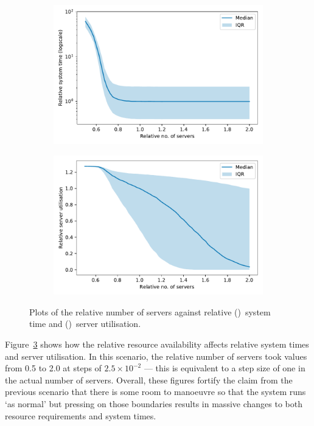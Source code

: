 \documentclass[11pt]{article}
\newlength{\imgwidth}
\begin{document}
\begin{figure}
    \centering
    \begin{subfigure}{.5\imgwidth}
        \includegraphics[width=\linewidth]{img_servers_time}
        \caption{}\label{fig:servers_time}
    \end{subfigure}\hfill%
    \begin{subfigure}{.5\imgwidth}
        \includegraphics[width=\linewidth]{img_servers_util}
        \caption{}\label{fig:servers_util}
    \end{subfigure}
    \caption{%
        Plots of the relative number of servers against relative
        ()~system time and
        ()~server utilisation.
    }\label{fig:servers}
\end{figure}

Figure~\ref{fig:servers} shows how the relative resource availability affects
relative system times and server utilisation. In this scenario, the relative
number of servers took values from 0.5 to 2.0 at steps of \(2.5 \times 10^{-2}\)
--- this is equivalent to a step size of one in the actual number of servers.
Overall, these figures fortify the claim from the previous scenario that there
is some room to manoeuvre so that the system runs `as normal' but pressing on
those boundaries results in massive changes to both resource requirements and
system times.
\end{document}
